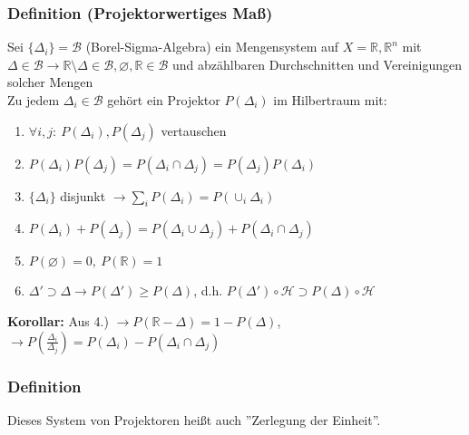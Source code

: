 \documentclass[twoside,a4paper]{scrartcl}
\newcommand{\R}{\mathbb{R}}
\renewcommand{\1}{\mathds{1}}
\newcommand{\ra}{\rightarrow}
\renewcommand{\H}{\mathcal{H}}
\renewcommand{\R}{\mathbb{R}}
\begin{document}
\subsubsection*{Definition (Projektorwertiges Maß)}
Sei $\{\Delta_i\}=\mathcal B$ (Borel-Sigma-Algebra) ein Mengensystem auf $X=\R,\R^n$ mit $\Delta \in \mathcal B \ra \R \setminus \Delta \in \mathcal B, \varnothing, \R \in \mathcal B$ und abzählbaren Durchschnitten und Vereinigungen solcher Mengen \\
Zu jedem $\Delta_i \in \mathcal B$ gehört ein Projektor $P(\Delta_i)$ im Hilbertraum mit:
\begin{enumerate}
 \item $\forall i,j: \ P(\Delta_i),P(\Delta_j)$ vertauschen
 \item $P(\Delta_i)P(\Delta_j)=P(\Delta_i \cap \Delta_j)=P(\Delta_j)P(\Delta_i)$
 \item $\{\Delta_i\}$ disjunkt $\ra \sum_iP(\Delta_i)=P(\cup_i\Delta_i)$
 \item $P(\Delta_i)+P(\Delta_j)=P(\Delta_i\cup \Delta_j)+P(\Delta_i\cap \Delta_j)$
 \item $P(\varnothing)=0,\ P(\R)=1 $
 \item $\Delta' \supset \Delta \ra P(\Delta') \geq P(\Delta)$, d.h. $P(\Delta') \circ \H \supset P(\Delta) \circ \H$
\end{enumerate}
\textbf{Korollar:} Aus 4.) $\ra P(\R-\Delta)=1-P(\Delta)$, $\ra P(\frac{\Delta_i}{\Delta_j})=P(\Delta_i)-P(\Delta_i \cap \Delta_j)$

\subsubsection*{Definition}
Dieses System von Projektoren heißt auch ''Zerlegung der Einheit''.

\end{document}
